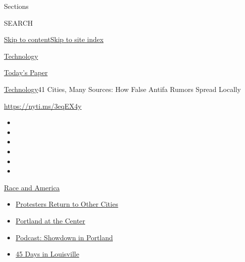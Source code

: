 Sections

SEARCH

\protect\hyperlink{site-content}{Skip to
content}\protect\hyperlink{site-index}{Skip to site index}

\href{https://www.nytimes3xbfgragh.onion/section/technology}{Technology}

\href{https://myaccount.nytimes3xbfgragh.onion/auth/login?response_type=cookie\&client_id=vi}{}

\href{https://www.nytimes3xbfgragh.onion/section/todayspaper}{Today's
Paper}

\href{/section/technology}{Technology}\textbar{}41 Cities, Many Sources:
How False Antifa Rumors Spread Locally

\url{https://nyti.ms/3eqEX4y}

\begin{itemize}
\item
\item
\item
\item
\item
\item
\end{itemize}

\href{https://www.nytimes3xbfgragh.onion/news-event/george-floyd-protests-minneapolis-new-york-los-angeles?action=click\&pgtype=Article\&state=default\&region=TOP_BANNER\&context=storylines_menu}{Race
and America}

\begin{itemize}
\tightlist
\item
  \href{https://www.nytimes3xbfgragh.onion/2020/07/26/us/protests-portland-seattle-trump.html?action=click\&pgtype=Article\&state=default\&region=TOP_BANNER\&context=storylines_menu}{Protesters
  Return to Other Cities}
\item
  \href{https://www.nytimes3xbfgragh.onion/2020/07/24/us/portland-oregon-protests-white-race.html?action=click\&pgtype=Article\&state=default\&region=TOP_BANNER\&context=storylines_menu}{Portland
  at the Center}
\item
  \href{https://www.nytimes3xbfgragh.onion/2020/07/23/podcasts/the-daily/portland-protests.html?action=click\&pgtype=Article\&state=default\&region=TOP_BANNER\&context=storylines_menu}{Podcast:
  Showdown in Portland}
\item
  \href{https://www.nytimes3xbfgragh.onion/interactive/2020/07/16/us/black-lives-matter-protests-louisville-breonna-taylor.html?action=click\&pgtype=Article\&state=default\&region=TOP_BANNER\&context=storylines_menu}{45
  Days in Louisville}
\end{itemize}

